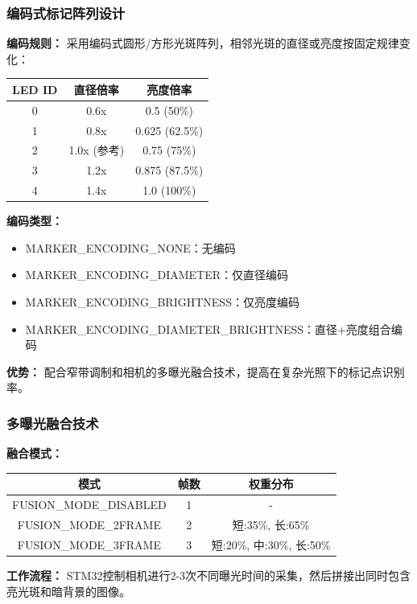 \documentclass[12pt, a4paper]{ctexart}
\begin{document}
\bigskip

\subsubsection{编码式标记阵列设计}

\textbf{编码规则：} 采用编码式圆形/方形光斑阵列，相邻光斑的直径或亮度按固定规律变化：

\begin{tabular}{ccc}
\toprule
LED ID & 直径倍率 & 亮度倍率 \\
\midrule
0 & 0.6x & 0.5 (50\%) \\
1 & 0.8x & 0.625 (62.5\%) \\
2 & 1.0x (参考) & 0.75 (75\%) \\
3 & 1.2x & 0.875 (87.5\%) \\
4 & 1.4x & 1.0 (100\%) \\
\bottomrule
\end{tabular}

\bigskip

\textbf{编码类型：}
\begin{itemize}
\item MARKER\_ENCODING\_NONE：无编码
\item MARKER\_ENCODING\_DIAMETER：仅直径编码
\item MARKER\_ENCODING\_BRIGHTNESS：仅亮度编码
\item MARKER\_ENCODING\_DIAMETER\_BRIGHTNESS：直径+亮度组合编码
\end{itemize}

\textbf{优势：} 配合窄带调制和相机的多曝光融合技术，提高在复杂光照下的标记点识别率。

\subsubsection{多曝光融合技术}

\textbf{融合模式：}

\begin{tabular}{ccc}
\toprule
模式 & 帧数 & 权重分布 \\
\midrule
FUSION\_MODE\_DISABLED & 1 & - \\
FUSION\_MODE\_2FRAME & 2 & 短:35\%, 长:65\% \\
FUSION\_MODE\_3FRAME & 3 & 短:20\%, 中:30\%, 长:50\% \\
\bottomrule
\end{tabular}

\bigskip

\textbf{工作流程：} STM32控制相机进行2-3次不同曝光时间的采集，然后拼接出同时包含亮光斑和暗背景的图像。
\end{document}
